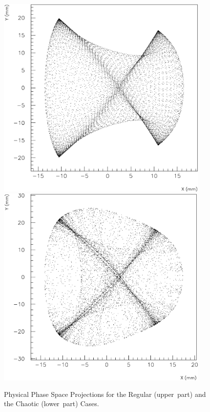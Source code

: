 \documentclass[a4paper,11pt]{report}
\begin{document}
\begin{figure}[H]
\begin{center}
  \mbox{\includegraphics*[width=10.5cm]{exp4}}
  \\[5mm]
  \mbox{\includegraphics*[width=10.5cm]{exp12}}
 \caption{Physical Phase Space Projections for the Regular
   \mbox{(upper part)} and the Chaotic \mbox{(lower part)} Cases.}
 \label{P-proj}
\end{center}
\end{figure}
\end{document}
